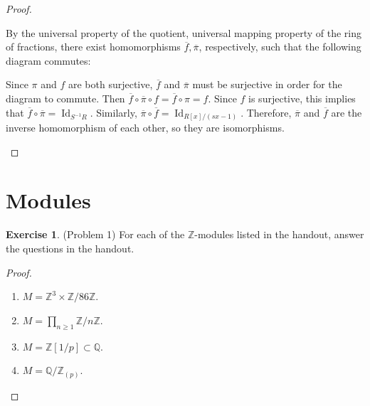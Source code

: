 \documentclass[12pt, psamsfonts]{amsart}
\theoremstyle{definition}
\newtheorem*{exer}{Exercise}
\theoremstyle{remark}
\DeclareMathOperator{\Id}{Id}
\numberwithin{equation}{section}
\begin{document}
\begin{proof}
\begin{itemize}
      By the universal property of the quotient, universal mapping property of the ring of fractions, there exist homomorphisms $\overline{f}, \overline{\pi}$, respectively, such that the following diagram commutes:
      \begin{center}
      \end{center}
      Since $\pi$ and $f$ are both surjective, $\overline{f}$ and $\overline{\pi}$ must be surjective in order for the diagram to commute.
      Then $\overline{f} \circ \overline{\pi} \circ f = \overline{f} \circ \pi = f$.
      Since $f$ is surjective, this implies that $\overline{f} \circ \overline{\pi} = \Id_{S^{-1}R}$.
      Similarly, $\overline{\pi} \circ \overline{f} = \Id_{R[x]/(sx - 1)}$.
      Therefore, $\overline{\pi}$ and $\overline{f}$ are the inverse homomorphism of each other, so they are isomorphisms.
  \end{itemize}
\end{proof}

\section{Modules}

\begin{exer}{(Problem 1)}
  For each of the $\mathbb{Z}$-modules listed in the handout, answer the questions in the handout.
\end{exer}

\begin{proof}
$ $
  \begin{enumerate}[label=(\alph*)]
    \item 
      $M = \mathbb{Z}^3 \times \mathbb{Z} / 86\mathbb{Z}$.
    \item 
      $M = \prod_{n \geq 1} \mathbb{Z} / n\mathbb{Z}$.
    \item 
      $M = \mathbb{Z}[1/p] \subset \mathbb{Q}$.
    \item 
      $M = \mathbb{Q} / \mathbb{Z}_{(p)}$.
  \end{enumerate}
\end{proof}
\end{document}
